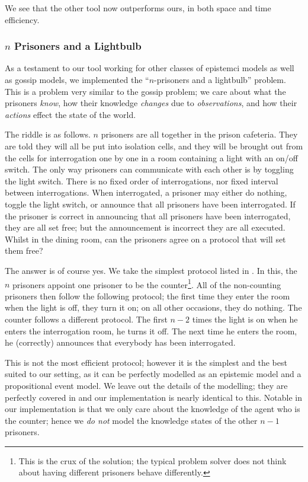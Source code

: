 \documentclass[10pt, a4paper]{report}
\begin{document}
We see that the other tool now outperforms ours, in both space and time
efficiency. 

\subsubsection{$n$ Prisoners and a Lightbulb}

As a testament to our tool working for other classes of epistemci models as well
as gossip models, we implemented the ``$n$-prisoners and a lightbulb'' problem.
This is a problem very similar to the gossip problem; we care about what the
prisoners \emph{know}, how their knowledge \emph{changes} due to
\emph{observations}, and how their \emph{actions} effect the state of the world. 

The riddle is as follows. $n$ prisoners are all together in the prison
cafeteria. They are told they will all be put into isolation cells, and they
will be brought out from the cells for interrogation one by one in a room
containing a light with an on/off switch. The only way prisoners can communicate
with each other is by toggling the light switch. There is no fixed order of
interrogations, nor fixed interval between interrogations. When interrogated, a
prisoner may either do nothing, toggle the light switch, or announce that all
prisoners have been interrogated. If the prisoner is correct in announcing that
all prisoners have been interrogated, they are all set free; but the
announcement is incorrect they are all executed. Whilst in the dining room, can
the prisoners agree on a protocol that will set them free? 

The answer is of course yes. We take the simplest protocol listed in
\cite{Prisoners}. In this, the $n$ prisoners appoint one prisoner to be the
counter\footnote{This is the crux of the solution; the typical problem solver
  does not think about having different prisoners behave differently.}. All of
the non-counting prisoners then follow the following protocol; the first time
they enter the room when the light is off, they turn it on; on all other
occasions, they do nothing. The counter follows a different protocol. The first
$n - 2$ times the light is on when he enters the interrogation room, he turns it
off. The next time he enters the room, he (correctly) announces that everybody
has been interrogated.

This is not the most efficient protocol; however it is the simplest and the best
suited to our setting, as it can be perfectly modelled as an epistemic model and
a propositional event model. We leave out the details of the modelling; they are
perfectly covered in \cite{Prisoners} and our implementation is nearly identical
to this. Notable in our implementation is that we only care about the knowledge
of the agent who is the counter; hence we \emph{do not} model the knowledge
states of the other $n - 1$ prisoners. 
\end{document}
